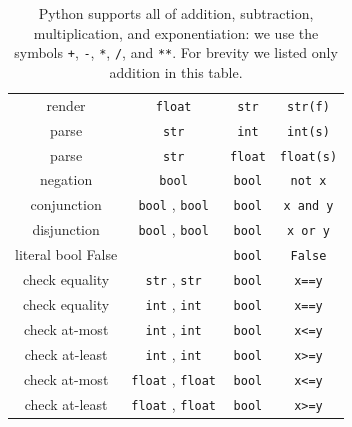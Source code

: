 \documentclass[11pt, justified]{tufte-book}
\theoremstyle{definition}
\begin{document}
\begin{table}[h]
\begin{tabular}{cccc}
            render              &\texttt{float}                   &\texttt{str}         &\texttt{str(f)}                        \\
            parse               &\texttt{str}                     &\texttt{int}         &\texttt{int(s)}                        \\
            parse               &\texttt{str}                     &\texttt{float}       &\texttt{float(s)}                      \\
            \hline
            negation            &\texttt{bool}                    &\texttt{bool}        &\texttt{not x}                         \\
            conjunction         &\texttt{bool}  , \texttt{bool}   &\texttt{bool}        &\texttt{x and y}                       \\
            disjunction         &\texttt{bool}  , \texttt{bool}   &\texttt{bool}        &\texttt{x or y}                        \\
            literal bool False  &                                 &\texttt{bool}        &\texttt{False}                         \\
            \hline
            check equality      &\texttt{str}   , \texttt{str}    &\texttt{bool}        &\texttt{x==y}                          \\
            check equality      &\texttt{int}   , \texttt{int}    &\texttt{bool}        &\texttt{x==y}                          \\
            check at-most       &\texttt{int}   , \texttt{int}    &\texttt{bool}        &\texttt{x<=y}                          \\
            check at-least      &\texttt{int}   , \texttt{int}    &\texttt{bool}        &\texttt{x>=y}                          \\
            check at-most       &\texttt{float} , \texttt{float}  &\texttt{bool}        &\texttt{x<=y}                          \\
            check at-least      &\texttt{float} , \texttt{float}  &\texttt{bool}        &\texttt{x>=y}                          \\
          \end{tabular}
          \caption{%
            Python supports all of addition, subtraction,
            multiplication, and exponentiation: we use the symbols
            \texttt{+}, \texttt{-}, \texttt{*}, \texttt{/}, and \texttt{**}.
            For brevity we listed only addition in this table.
          }
        \end{table}
\end{document}
